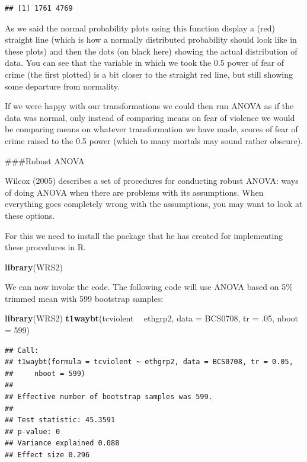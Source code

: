 \documentclass[]{book}
\newenvironment{Shaded}{\begin{snugshade}}{\end{snugshade}}
\newcommand{\DataTypeTok}[1]{\textcolor[rgb]{0.13,0.29,0.53}{#1}}
\newcommand{\DecValTok}[1]{\textcolor[rgb]{0.00,0.00,0.81}{#1}}
\newcommand{\FloatTok}[1]{\textcolor[rgb]{0.00,0.00,0.81}{#1}}
\newcommand{\KeywordTok}[1]{\textcolor[rgb]{0.13,0.29,0.53}{\textbf{#1}}}
\newcommand{\NormalTok}[1]{#1}
\newcommand{\OperatorTok}[1]{\textcolor[rgb]{0.81,0.36,0.00}{\textbf{#1}}}
\newcommand{\StringTok}[1]{\textcolor[rgb]{0.31,0.60,0.02}{#1}}
\theoremstyle{definition}
\theoremstyle{definition}
\theoremstyle{definition}
\theoremstyle{remark}
\begin{document}
\begin{verbatim}
## [1] 1761 4769
\end{verbatim}

As we said the normal probability plots using this function display a
(red) straight line (which is how a normally distributed probability
should look like in these plots) and then the dots (on black here)
showing the actual distribution of data. You can see that the variable
in which we took the 0.5 power of fear of crime (the first plotted) is a
bit closer to the straight red line, but still showing some departure
from normality.

If we were happy with our transformations we could then run ANOVA as if
the data was normal, only instead of comparing means on fear of violence
we would be comparing means on whatever transformation we have made,
scores of fear of crime raised to the 0.5 power (which to many mortals
may sound rather obscure).

\#\#\#Robust ANOVA

Wilcox (2005) describes a set of procedures for conducting robust ANOVA:
ways of doing ANOVA when there are problems with its assumptions. When
everything goes completely wrong with the assumptions, you may want to
look at these options.

For this we need to install the package that he has created for
implementing these procedures in R.

\begin{Shaded}
\begin{Highlighting}[]
\KeywordTok{library}\NormalTok{(WRS2) }
\end{Highlighting}
\end{Shaded}

We can now invoke the code. The following code will use ANOVA based on
5\% trimmed mean with 599 bootstrap samples:

\begin{Shaded}
\begin{Highlighting}[]
\KeywordTok{library}\NormalTok{(WRS2)}
\KeywordTok{t1waybt}\NormalTok{(tcviolent }\OperatorTok{~}\StringTok{ }\NormalTok{ethgrp2, }\DataTypeTok{data =}\NormalTok{ BCS0708, }\DataTypeTok{tr =} \FloatTok{.05}\NormalTok{, }\DataTypeTok{nboot =} \DecValTok{599}\NormalTok{)}
\end{Highlighting}
\end{Shaded}

\begin{verbatim}
## Call:
## t1waybt(formula = tcviolent ~ ethgrp2, data = BCS0708, tr = 0.05, 
##     nboot = 599)
## 
## Effective number of bootstrap samples was 599.
## 
## Test statistic: 45.3591 
## p-value: 0 
## Variance explained 0.088 
## Effect size 0.296
\end{verbatim}
\end{document}
